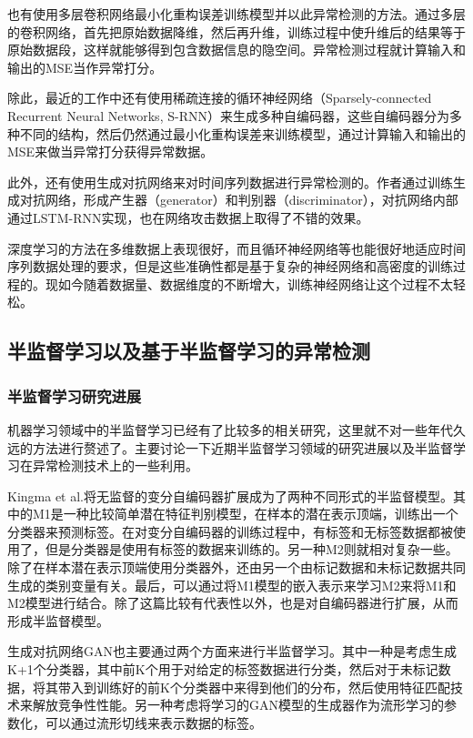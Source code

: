 也有使用多层卷积网络最小化重构误差训练模型并以此异常检测的方法\cite{kieu2018outlier}。通过多层的卷积网络，首先把原始数据降维，然后再升维，训练过程中使升维后的结果等于原始数据段，这样就能够得到包含数据信息的隐空间。异常检测过程就计算输入和输出的MSE当作异常打分。

除此，最近的工作中还有使用稀疏连接的循环神经网络（Sparsely-connected Recurrent Neural Networks, S-RNN）来生成多种自编码器，这些自编码器分为多种不同的结构，然后仍然通过最小化重构误差来训练模型，通过计算输入和输出的MSE来做当异常打分获得异常数据\cite{kieu2019outlier}。

此外，还有使用生成对抗网络来对时间序列数据进行异常检测的\cite{li2019mad}。作者通过训练生成对抗网络，形成产生器（generator）和判别器（discriminator），对抗网络内部通过LSTM-RNN实现，也在网络攻击数据上取得了不错的效果。

深度学习的方法在多维数据上表现很好，而且循环神经网络等也能很好地适应时间序列数据处理的要求，但是这些准确性都是基于复杂的神经网络和高密度的训练过程的。现如今随着数据量、数据维度的不断增大，训练神经网络让这个过程不太轻松。

\subsection{半监督学习以及基于半监督学习的异常检测}

\subsubsection{半监督学习研究进展}

机器学习领域中的半监督学习已经有了比较多的相关研究\cite{Hady2013Semi}，这里就不对一些年代久远的方法进行赘述了。主要讨论一下近期半监督学习领域的研究进展以及半监督学习在异常检测技术上的一些利用。

Kingma et al.\cite{Kingma2014Semi}将无监督的变分自编码器扩展成为了两种不同形式的半监督模型。其中的M1是一种比较简单潜在特征判别模型，在样本的潜在表示顶端，训练出一个分类器来预测标签。在对变分自编码器的训练过程中，有标签和无标签数据都被使用了，但是分类器是使用有标签的数据来训练的。另一种M2则就相对复杂一些。除了在样本潜在表示顶端使用分类器外，还由另一个由标记数据和未标记数据共同生成的类别变量有关。最后，可以通过将M1模型的嵌入表示来学习M2来将M1和M2模型进行结合。除了这篇比较有代表性以外，\cite{siddharth2017learning, sonderby2016ladder}也是对自编码器进行扩展，从而形成半监督模型。

生成对抗网络GAN也主要通过两个方面来进行半监督学习。其中一种是考虑生成K+1个分类器，其中前K个用于对给定的标签数据进行分类，然后对于未标记数据，将其带入到训练好的前K个分类器中来得到他们的分布，然后使用特征匹配技术来解放竞争性性能\cite{DBLP:journals/corr/SalimansGZCRC16}。另一种考虑将学习的GAN模型的生成器作为流形学习的参数化，可以通过流形切线来表示数据的标签\cite{DBLP:conf/cvpr/QiZHEWH18}。

